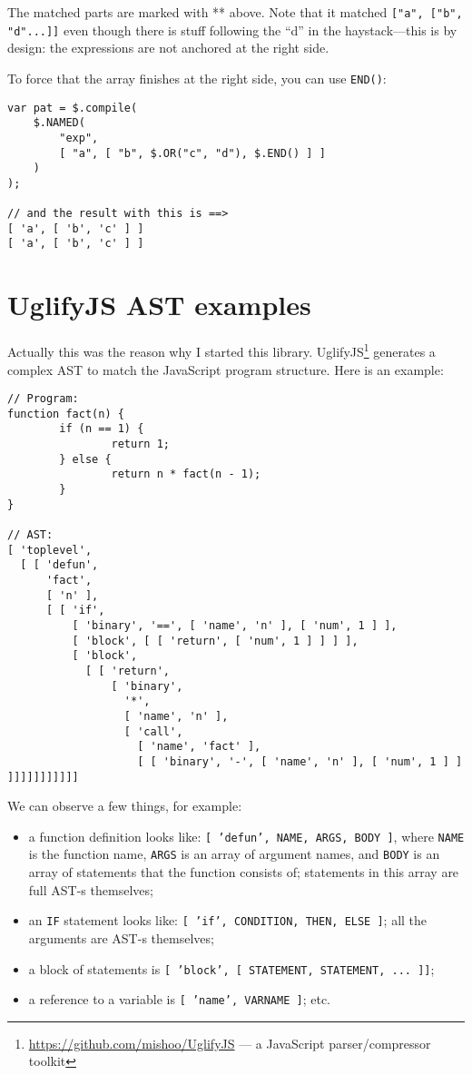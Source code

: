 \documentclass[a4paper,10pt]{article}
\begin{document}
The matched parts are marked with ** above.  Note that it matched \texttt{["a", ["b", "d"...]]} even though there is stuff following the “d” in the
haystack—this is by design: the expressions are not anchored at the right
side.

To force that the array finishes at the right side, you can use \texttt{END()}:


\begin{verbatim}
var pat = $.compile(
    $.NAMED(
        "exp",
        [ "a", [ "b", $.OR("c", "d"), $.END() ] ]
    )
);

// and the result with this is ==>
[ 'a', [ 'b', 'c' ] ]
[ 'a', [ 'b', 'c' ] ]
\end{verbatim}
\section{UglifyJS AST examples}
\label{sec-3}


Actually this was the reason why I started this library.
UglifyJS\footnote{\href{https://github.com/mishoo/UglifyJS}{https://github.com/mishoo/UglifyJS} — a JavaScript
parser/compressor toolkit } generates a complex AST to match the JavaScript
program structure.  Here is an example:


\begin{verbatim}
// Program:
function fact(n) {
        if (n == 1) {
                return 1;
        } else {
                return n * fact(n - 1);
        }
}

// AST:
[ 'toplevel',
  [ [ 'defun',
      'fact',
      [ 'n' ],
      [ [ 'if',
          [ 'binary', '==', [ 'name', 'n' ], [ 'num', 1 ] ],
          [ 'block', [ [ 'return', [ 'num', 1 ] ] ] ],
          [ 'block',
            [ [ 'return',
                [ 'binary',
                  '*',
                  [ 'name', 'n' ],
                  [ 'call',
                    [ 'name', 'fact' ],
                    [ [ 'binary', '-', [ 'name', 'n' ], [ 'num', 1 ] ] ]]]]]]]]]]]
\end{verbatim}

We can observe a few things, for example:

\begin{itemize}
\item a function definition looks like: \texttt{[ 'defun', NAME, ARGS, BODY ]}, where
  \texttt{NAME} is the function name, \texttt{ARGS} is an array of argument names, and
  \texttt{BODY} is an array of statements that the function consists of; statements
  in this array are full AST-s themselves;
\item an \texttt{IF} statement looks like: \texttt{[ 'if', CONDITION, THEN, ELSE ]}; all the
  arguments are AST-s themselves;
\item a block of statements is \texttt{[ 'block', [ STATEMENT, STATEMENT, ... ]]};
\item a reference to a variable is \texttt{[ 'name', VARNAME ]}; etc.
\end{itemize}
\end{document}
